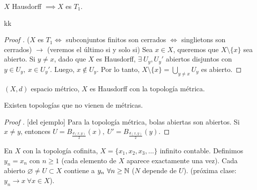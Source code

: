 \begin{lemma}
	$X$ Hausdorff $\implies X$ es $T_1$.
\end{lemma}
kk
\begin{proof}[Proof ]
	($X$ es $T_1 \iff$ subconjuntos finitos son cerrados $\iff$ singlietons son cerrados) $\rightarrow$ (veremos el último si y solo si) Sea $x \in X$, queremos que $X \setminus \{x\}$ sea abierto. Si $y \neq x$, dado que $X$ es Hausdorff, $\exists\ U_y, U_y'$ abiertos disjuntos con $y \in U_y,\ x \in U_y'$. Luego, $x \not\in U_y$. Por lo tanto, $X \setminus \{ x \} = \displaystyle\bigcup_{y \neq x} U_y$ es abierto.
\end{proof}

\begin{eg}
	$(X,d)$ espacio métrico, $X$ es Hausdorff con la topología métrica.
\end{eg}

\begin{corollary}[secreto]
	Existen topologías que no vienen de métricas.
\end{corollary}

\begin{proof}[Proof ][del ejemplo]
	Para la topología métrica, bolas abiertas son abiertos. Si $x \neq y$, entonces $U = B_{\frac{d(x,y)}{2}}(x),\ U' = B_{\frac{d(x,y)}{2}}(y)$.
\end{proof}

En $X$ con la topología cofinita, $X = \{ x_1, x_2, x_3,\dots \}$ infinito contable. Definimos $y_n = x_n$ con $n \geq 1$ (cada elemento de $X$ aparece exactamente una vez). Cada abierto $\varnothing \neq U \subset X$ contiene a $y_n \ \forall n \geq \mathbb{N}$ ($N$ depende de $U$). (próxima clase: $y_n \to x \ \forall x \in X$). 

